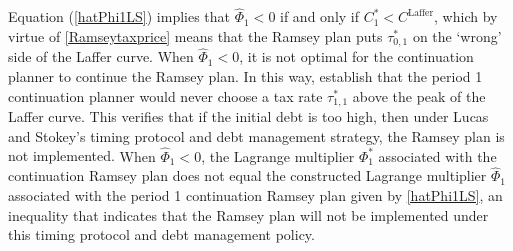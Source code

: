 \documentclass[12pt]{article}
\newcommand{\NW}[1]{{\textcolor{blue}{#1}}}
\newcommand{\TS}[1]{{\textcolor{magenta}{#1}}}
\begin{document}

Equation (\ref{hatPhi1LS}) implies  that  $\widehat\Phi_1<0$ if and only if  $C_1^*<C^{\text{Laffer}}$, which by virtue of \eqref{Ramseytaxprice} means that the Ramsey plan puts $\tau_{0,1}^*$  on the %
 `wrong' side of the Laffer curve. %
When   $\widehat\Phi_1<0$, it is not optimal for the continuation planner to  continue the Ramsey plan. %
In this way, 
\cite{debortoli2021optimal}   establish that the period 1 continuation planner would never  choose a  tax rate $\tau_{1,1}^*$  above the peak of the Laffer curve.
This verifies that  if the initial debt is too high, then under Lucas and Stokey's timing protocol and debt management strategy, the Ramsey plan is not implemented. 
{When $\widehat{\Phi}_1<0$, the  Lagrange multiplier ${\Phi}_1^\ast$  associated with the continuation Ramsey plan does not equal the constructed Lagrange multiplier 
 $\widehat\Phi_1$ associated with the  period 1 continuation Ramsey plan given by \eqref{hatPhi1LS}, an 
inequality that indicates that the   Ramsey plan will  not be implemented under this  
  timing protocol and debt management policy.} 

\end{document}

